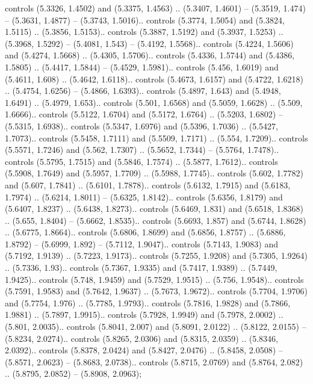 controls (5.3326, 1.4502) and (5.3375, 1.4563) .. (5.3407, 1.4601) -- (5.3519, 1.474) -- (5.3631, 1.4877) -- (5.3743, 1.5016).. controls (5.3774, 1.5054) and (5.3824, 1.5115) .. (5.3856, 1.5153).. controls (5.3887, 1.5192) and (5.3937, 1.5253) .. (5.3968, 1.5292) -- (5.4081, 1.543) -- (5.4192, 1.5568).. controls (5.4224, 1.5606) and (5.4274, 1.5668) .. (5.4305, 1.5706).. controls (5.4336, 1.5744) and (5.4386, 1.5805) .. (5.4417, 1.5844) -- (5.4529, 1.5981).. controls (5.456, 1.6019) and (5.4611, 1.608) .. (5.4642, 1.6118).. controls (5.4673, 1.6157) and (5.4722, 1.6218) .. (5.4754, 1.6256) -- (5.4866, 1.6393).. controls (5.4897, 1.643) and (5.4948, 1.6491) .. (5.4979, 1.653).. controls (5.501, 1.6568) and (5.5059, 1.6628) .. (5.509, 1.6666).. controls (5.5122, 1.6704) and (5.5172, 1.6764) .. (5.5203, 1.6802) -- (5.5315, 1.6938).. controls (5.5347, 1.6976) and (5.5396, 1.7036) .. (5.5427, 1.7073).. controls (5.5458, 1.7111) and (5.5509, 1.7171) .. (5.554, 1.7209).. controls (5.5571, 1.7246) and (5.562, 1.7307) .. (5.5652, 1.7344) -- (5.5764, 1.7478).. controls (5.5795, 1.7515) and (5.5846, 1.7574) .. (5.5877, 1.7612).. controls (5.5908, 1.7649) and (5.5957, 1.7709) .. (5.5988, 1.7745).. controls (5.602, 1.7782) and (5.607, 1.7841) .. (5.6101, 1.7878).. controls (5.6132, 1.7915) and (5.6183, 1.7974) .. (5.6214, 1.8011) -- (5.6325, 1.8142).. controls (5.6356, 1.8179) and (5.6407, 1.8237) .. (5.6438, 1.8273).. controls (5.6469, 1.831) and (5.6518, 1.8368) .. (5.655, 1.8404) -- (5.6662, 1.8535).. controls (5.6693, 1.857) and (5.6744, 1.8628) .. (5.6775, 1.8664).. controls (5.6806, 1.8699) and (5.6856, 1.8757) .. (5.6886, 1.8792) -- (5.6999, 1.892) -- (5.7112, 1.9047).. controls (5.7143, 1.9083) and (5.7192, 1.9139) .. (5.7223, 1.9173).. controls (5.7255, 1.9208) and (5.7305, 1.9264) .. (5.7336, 1.93).. controls (5.7367, 1.9335) and (5.7417, 1.9389) .. (5.7449, 1.9425).. controls (5.748, 1.9459) and (5.7529, 1.9515) .. (5.756, 1.9548).. controls (5.7591, 1.9583) and (5.7642, 1.9637) .. (5.7673, 1.9672).. controls (5.7704, 1.9706) and (5.7754, 1.976) .. (5.7785, 1.9793).. controls (5.7816, 1.9828) and (5.7866, 1.9881) .. (5.7897, 1.9915).. controls (5.7928, 1.9949) and (5.7978, 2.0002) .. (5.801, 2.0035).. controls (5.8041, 2.007) and (5.8091, 2.0122) .. (5.8122, 2.0155) -- (5.8234, 2.0274).. controls (5.8265, 2.0306) and (5.8315, 2.0359) .. (5.8346, 2.0392).. controls (5.8378, 2.0424) and (5.8427, 2.0476) .. (5.8458, 2.0508) -- (5.8571, 2.0623) -- (5.8683, 2.0738).. controls (5.8715, 2.0769) and (5.8764, 2.082) .. (5.8795, 2.0852) -- (5.8908, 2.0963);



